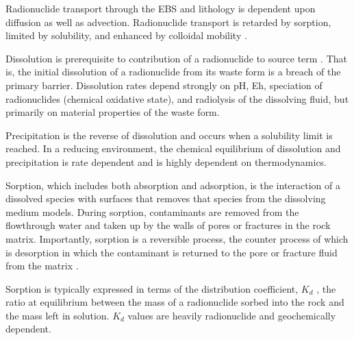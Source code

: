 Radionuclide transport through the \gls{EBS} and lithology is dependent upon 
diffusion as well as advection. Radionuclide transport is retarded by sorption,
limited by solubility, and enhanced by colloidal mobility 
\cite{bracke_safety_2008}. 

Dissolution is prerequisite to contribution of a radionuclide to source term 
\cite{bracke_safety_2008}. That is, the initial 
dissolution of a radionuclide from its waste form is a breach of the primary
barrier. Dissolution rates depend strongly on pH, Eh,
speciation of radionuclides (chemical oxidative state), and radiolysis of the
dissolving fluid, but primarily on material properties of the waste form.

Precipitation is the reverse of dissolution and occurs when a solubility limit
is reached. In a reducing environment, the chemical equilibrium of dissolution and
precipitation is rate dependent and is highly dependent on thermodynamics.

Sorption, which includes both absorption and adsorption,  is the interaction of a
dissolved species with surfaces that removes that species from the dissolving
medium models. During sorption, contaminants are removed from the flowthrough 
water and taken up by the walls of pores or fractures in the rock matrix. 
Importantly, sorption is a reversible process, the  counter process of which is 
desorption in which the contaminant is returned to the pore or fracture fluid from 
the matrix \cite{ahn_mass_1988} .  

Sorption is typically expressed in terms of the distribution coefficient, $K_d$ , 
the ratio at equilibrium between the mass of a radionuclide sorbed into the 
rock and the mass left in solution. $K_d$ values are heavily radionuclide and 
geochemically dependent.  





